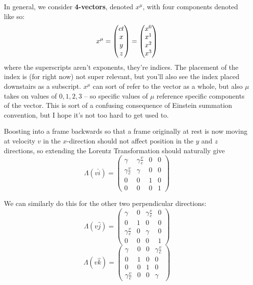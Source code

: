 
In general, we consider \textbf{4-vectors}, denoted $x^\mu$, with four components denoted like so: 
\[
    x^\mu = \begin{pmatrix} ct \\ x \\ y \\ z \end{pmatrix} = \begin{pmatrix} x^0 \\ x^1 \\ x^2 \\ x^3 \end{pmatrix}
\]
where the superscripts aren't exponents, they're indices. The placement of the index is (for right now) not super relevant, but you'll also see the index placed downstairs as a subscript. $x^\mu$ can sort of refer to the vector as a whole, but also $\mu$ takes on values of $0, 1, 2, 3$ -- so specific values of $\mu$ reference specific components of the vector. This is sort of a confusing consequence of Einstein summation convention, but I hope it's not too hard to get used to. 

Boosting into a frame backwards so that a frame originally at rest is now moving at velocity $v$ in the $x$-direction should not affect position in the $y$ and $z$ directions, so extending the Lorentz Transformation should naturally give
\[
\Lambda(v \hat i) = 
\begin{pmatrix}
    \gamma & \gamma \frac{v}{c} & 0 & 0 \\
    \gamma \frac{v}{c} & \gamma & 0 & 0 \\
    0 & 0 & 1 & 0 \\
    0 & 0 & 0 & 1 
\end{pmatrix}
\]

We can similarly do this for the other two perpendicular directions: 
\[ \Lambda(v\hat{j}) = 
\begin{pmatrix}
    \gamma & 0 & \gamma \frac{v}{c} & 0 \\
    0 & 1 & 0 & 0 \\
    \gamma \frac{v}{c} & 0 & \gamma & 0 \\
    0 & 0 & 0 & 1
\end{pmatrix}
\]
\[ \Lambda(v\hat{k}) = 
\begin{pmatrix}
    \gamma & 0 & 0 & \gamma\frac{v}{c} \\
    0 & 1 & 0 & 0 \\
    0 & 0  & 1 & 0 \\
     \gamma \frac{v}{c} & 0 & 0 & \gamma
\end{pmatrix}
\]

